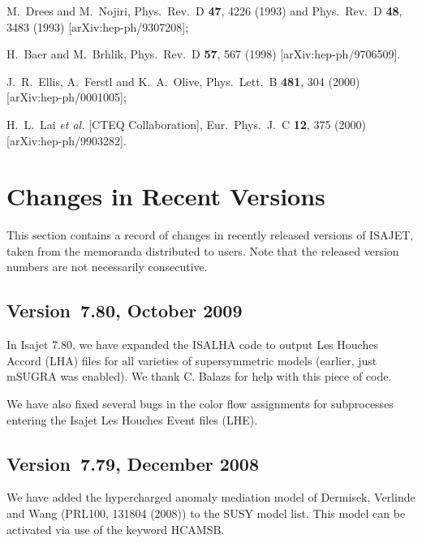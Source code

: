 \begin{thebibliography}{99}
M.~Drees and M.~Nojiri,
Phys.\ Rev.\ D {\bf 47}, 4226 (1993) and
Phys.\ Rev.\ D {\bf 48}, 3483 (1993)
[arXiv:hep-ph/9307208];

H.~Baer and M.~Brhlik,
Phys.\ Rev.\ D {\bf 57}, 567 (1998)
[arXiv:hep-ph/9706509].

J.~R.~Ellis, A.~Ferstl and K.~A.~Olive,
Phys.\ Lett.\ B {\bf 481}, 304 (2000)
[arXiv:hep-ph/0001005];

H.~L.~Lai {\it et al.}  [CTEQ Collaboration],
Eur.\ Phys.\ J.\ C {\bf 12}, 375 (2000)
[arXiv:hep-ph/9903282].

\end{thebibliography}
\newpage
\section{Changes in Recent Versions}

        This section contains a record of changes in recently released
versions of ISAJET, taken from the memoranda distributed to users.
Note that the released version numbers are not necessarily consecutive.

\subsection{Version~7.80, October 2009}

In Isajet 7.80, we have expanded the ISALHA code to output
Les Houches Accord (LHA) files for all varieties of supersymmetric 
models (earlier, just mSUGRA was enabled). We thank C. Balazs
for help with this piece of code. 

We have also fixed several bugs in the color flow assignments 
for subprocesses entering the Isajet Les Houches Event files (LHE). 


\subsection{Version~7.79, December 2008}

We have added the hypercharged anomaly mediation model of
Dermisek, Verlinde and Wang (PRL100, 131804 (2008)) to the SUSY
model list. This model can be activated via use of the keyword HCAMSB.

